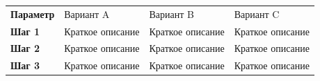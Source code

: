 \documentclass[varwidth=18cm,border=4mm]{standalone}
\begin{document}
\renewcommand{\arraystretch}{1.25}
\begin{tabularx}{16.4cm}{
  >{\raggedright\arraybackslash\bfseries}p{3.2cm}
  Y
  Y
  Y
}
Параметр & Вариант A & Вариант B & Вариант C \\
Шаг 1 & Краткое описание & Краткое описание & Краткое описание \\
Шаг 2 & Краткое описание & Краткое описание & Краткое описание \\
Шаг 3 & Краткое описание & Краткое описание & Краткое описание \\
\end{tabularx}
\end{document}
